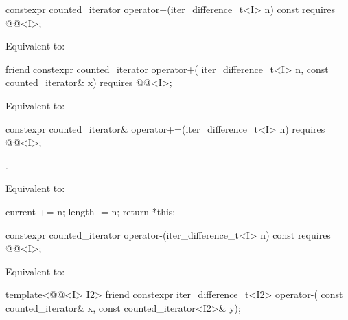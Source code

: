 %
\begin{itemdecl}
  constexpr counted_iterator operator+(iter_difference_t<I> n) const
    requires @@<I>;
\end{itemdecl}

\begin{itemdescr}
\pnum
\effects
Equivalent to: 
\end{itemdescr}

%
\begin{itemdecl}
friend constexpr counted_iterator operator+(
  iter_difference_t<I> n, const counted_iterator& x)
    requires @@<I>;
\end{itemdecl}

\begin{itemdescr}
\pnum
\effects
Equivalent to: 
\end{itemdescr}

%
\begin{itemdecl}
  constexpr counted_iterator& operator+=(iter_difference_t<I> n)
    requires @@<I>;
\end{itemdecl}

\begin{itemdescr}
\pnum
\expects
{}.

\pnum
\effects
Equivalent to:
\begin{codeblock}
current += n;
length -= n;
return *this;
\end{codeblock}
\end{itemdescr}

%
\begin{itemdecl}
  constexpr counted_iterator operator-(iter_difference_t<I> n) const
    requires @@<I>;
\end{itemdecl}

\begin{itemdescr}
\pnum
\effects
Equivalent to: 
\end{itemdescr}

%
\begin{itemdecl}
template<@@<I> I2>
  friend constexpr iter_difference_t<I2> operator-(
    const counted_iterator& x, const counted_iterator<I2>& y);
\end{itemdecl}

